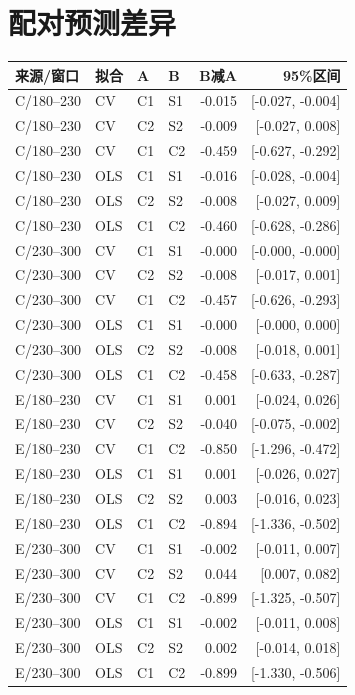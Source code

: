 \documentclass[11pt,a4paper]{article}
\begin{document}
\section{配对预测差异}
\small\begin{longtable}{llllrr}\toprule
来源/窗口 & 拟合 & A & B & B减A & 95\%区间\\\midrule\endhead
C/180--230 & CV & C1 & S1 & -0.015 & [-0.027, -0.004]\\
C/180--230 & CV & C2 & S2 & -0.009 & [-0.027, 0.008]\\
C/180--230 & CV & C1 & C2 & -0.459 & [-0.627, -0.292]\\
C/180--230 & OLS & C1 & S1 & -0.016 & [-0.028, -0.004]\\
C/180--230 & OLS & C2 & S2 & -0.008 & [-0.027, 0.009]\\
C/180--230 & OLS & C1 & C2 & -0.460 & [-0.628, -0.286]\\
C/230--300 & CV & C1 & S1 & -0.000 & [-0.000, -0.000]\\
C/230--300 & CV & C2 & S2 & -0.008 & [-0.017, 0.001]\\
C/230--300 & CV & C1 & C2 & -0.457 & [-0.626, -0.293]\\
C/230--300 & OLS & C1 & S1 & -0.000 & [-0.000, 0.000]\\
C/230--300 & OLS & C2 & S2 & -0.008 & [-0.018, 0.001]\\
C/230--300 & OLS & C1 & C2 & -0.458 & [-0.633, -0.287]\\
E/180--230 & CV & C1 & S1 & 0.001 & [-0.024, 0.026]\\
E/180--230 & CV & C2 & S2 & -0.040 & [-0.075, -0.002]\\
E/180--230 & CV & C1 & C2 & -0.850 & [-1.296, -0.472]\\
E/180--230 & OLS & C1 & S1 & 0.001 & [-0.026, 0.027]\\
E/180--230 & OLS & C2 & S2 & 0.003 & [-0.016, 0.023]\\
E/180--230 & OLS & C1 & C2 & -0.894 & [-1.336, -0.502]\\
E/230--300 & CV & C1 & S1 & -0.002 & [-0.011, 0.007]\\
E/230--300 & CV & C2 & S2 & 0.044 & [0.007, 0.082]\\
E/230--300 & CV & C1 & C2 & -0.899 & [-1.325, -0.507]\\
E/230--300 & OLS & C1 & S1 & -0.002 & [-0.011, 0.008]\\
E/230--300 & OLS & C2 & S2 & 0.002 & [-0.014, 0.018]\\
E/230--300 & OLS & C1 & C2 & -0.899 & [-1.330, -0.506]\\
\bottomrule\end{longtable}\normalsize
\end{document}
